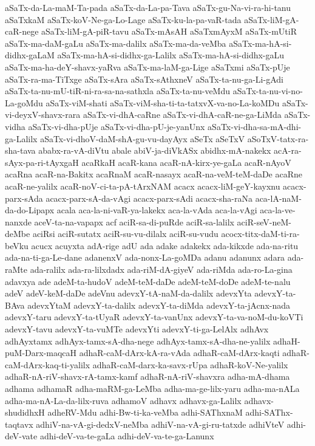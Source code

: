 {aSaTx-da-La-maM-Ta-pada
aSaTx-da-La-pa-Tava
aSaTx-gu-Na-vi-ra-hi-tanu
aSaTxkaM
aSaTx-koV-Ne-ga-Lo-Lage
aSaTx-ku-la-pa-vaR-tada
aSaTx-liM-gA-caR-nege
aSaTx-liM-gA-piR-tavu
aSaTx-mAsAH
aSaTxmAyxM
aSaTx-mUtiR
aSaTx-ma-daM-gaLu
aSaTx-ma-dalilx
aSaTx-ma-da-veMba
aSaTx-ma-hA-si-didhx-gaLaM
aSaTx-ma-hA-si-didhx-ga-Lalilx
aSaTx-ma-hA-si-didhx-gaLu
aSaTx-ma-ha-deY-shavx-yaRva
aSaTx-ma-laM-ga-Lige
aSaTxmi
aSaTx-pUje
aSaTx-ra-ma-TiTxge
aSaTx-sAra
aSaTx-sAthxneV
aSaTx-ta-nu-ga-Li-gAdi
aSaTx-ta-nu-mU-tiR-ni-ra-sa-na-sathxla
aSaTx-ta-nu-veMdu
aSaTx-ta-nu-vi-no-La-goMdu
aSaTx-viM-shati
aSaTx-viM-sha-ti-ta-tatxvX-va-no-La-koMDu
aSaTx-vi-deyxV-shavx-rara
aSaTx-vi-dhA-caRne
aSaTx-vi-dhA-caR-ne-ga-LiMda
aSaTx-vidha
aSaTx-vi-dha-pUje
aSaTx-vi-dha-pU-je-yanUnx
aSaTx-vi-dha-sa-mA-dhi-ga-Lalilx
aSaTx-vi-dhoV-daM-shA-gu-vu-dayAyx
aSeTx
aSeTxV
aSoTxV-tatx-ra-sha-tava
ababx-ra-vA-diVtu
abale
abiV-ja-diVkASx
abidhx-mA-nakekx
acA-ra-sAyx-pa-ri-tAyxgaH
acaRkaH
acaR-kana
acaR-nA-kirx-ye-gaLa
acaR-nAyoV
acaRna
acaR-na-Bakitx
acaRnaM
acaR-nasayx
acaR-na-veM-teM-daDe
acaRne
acaR-ne-yalilx
acaR-noV-ci-ta-pA-tArxNAM
acacx
acacx-liM-geY-kayxnu
acacx-parx-sAda
acacx-parx-sA-da-vAgi
acacx-parx-sAdi
acacx-sha-raNa
aca-lA-naM-da-do-Lipapx
acala
aca-la-ni-vaR-ya-lakekx
aca-la-vAda
aca-la-vAgi
aca-la-ve-nanxde
aceV-ta-na-vapapx
acf
aciR-sa-di-puRde
aciR-sa-lalilx
aciR-seV-neM-deMbe
aciRsi
aciR-sutatx
aciR-su-vu-dilalx
aciR-su-vudu
acocx-titx-daM-ti-ra-beVku
acucx
acuyxta
adA-rige
adU
ada
adake
adakekx
ada-kikxde
ada-na-ritu
ada-na-ti-ga-Le-dane
adanenxV
ada-nonx-La-goMDa
adanu
adanunx
adara
ada-raMte
ada-ralilx
ada-ra-lilxdadx
ada-riM-dA-giyeV
ada-riMda
ada-ro-La-gina
adavxya
ade
adeM-ta-hudoV
adeM-teM-daDe
adeM-teM-doDe
adeM-te-nalu
adeV
adeV-keM-daDe
adeVnu
adevxY-tA-naM-da-dalilx
adevxYta
adevxY-ta-BAva
adevxYtaM
adevxY-ta-dalilx
adevxY-ta-diMda
adevxY-ta-jAcnx-nada
adevxY-taru
adevxY-ta-tUyaR
adevxY-ta-vanUnx
adevxY-ta-va-noM-du-koVTi
adevxY-tavu
adevxY-ta-vuMTe
adevxYti
adevxY-ti-ga-LelAlx
adhAvx
adhAyxtamx
adhAyx-tamx-sA-dha-nege
adhAyx-tamx-sA-dha-ne-yalilx
adhaH-puM-Darx-maqcaH
adhaR-caM-dArx-kA-ra-vAda
adhaR-caM-dArx-kaqti
adhaR-caM-dArx-kaq-ti-yalilx
adhaR-caM-darx-ka-savx-rUpa
adhaR-koV-Ne-yalilx
adhaR-nA-riV-shavx-rA-tamx-kamf
adhaR-nA-riV-shavxra
adha-mA-dhama
adhama
adhamaR
adha-maRM-ga-LeMba
adha-ma-ge-lilx-yaru
adha-ma-nALa
adha-ma-nA-La-da-lilx-ruva
adhamoV
adhavx
adhavx-ga-Lalilx
adhavx-shudidhxH
adheRV-Mdu
adhi-Bw-ti-ka-veMba
adhi-SAThxnaM
adhi-SAThx-taqtavx
adhiV-na-vA-gi-dedxV-neMba
adhiV-na-vA-gi-ru-tatxde
adhiVteV
adhi-deV-vate
adhi-deV-va-te-gaLa
adhi-deV-va-te-ga-Lanunx
}
